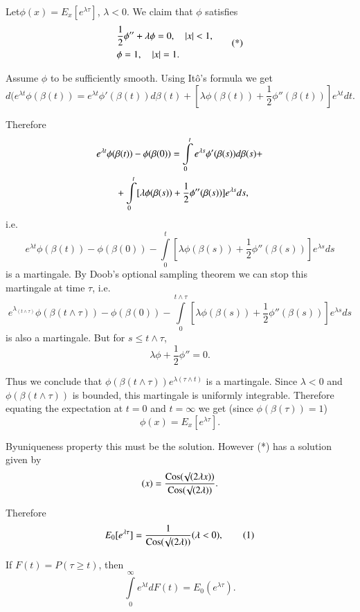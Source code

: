 Let\pageoriginale  $\phi(x)=E_{x}[e^{\lambda\tau}]$, $\lambda<0$. We
claim that $\phi$ satisfies
\begin{equation*}
\begin{split}
& \frac{1}{2}\phi''+\lambda\phi=0,\quad |x|<1,\\
& \phi=1,\quad |x|=1.
\end{split}\tag{*}
\end{equation*}
 
Assume $\phi$ to be sufficiently smooth. Using It\^o's formula we get
$$
d(e^{\lambda t}\phi(\beta(t))=e^{\lambda
  t}\phi'(\beta(t))d\beta(t)+[\lambda\phi(\beta(t))+\frac{1}{2}\phi''(\beta(t))]e^{\lambda t}dt.
$$

Therefore
\begin{align*}
& e^{\lambda
  t}\phi(\beta(t))-\phi(\beta(0))=\int\limits^{t}_{0}e^{\lambda
  s}\phi'(\beta(s))d\beta(s)+\\
&\qquad
  +\int\limits^{t}_{0}[\lambda\phi(\beta(s))+\frac{1}{2}\phi''(\beta(s))]e^{\lambda s}ds,
\end{align*}
i.e.
$$
e^{\lambda
  t}\phi(\beta(t))-\phi(\beta(0))-\int\limits^{t}_{0}[\lambda\phi(\beta(s))+\frac{1}{2}\phi''(\beta(s))]e^{\lambda
  s}ds
$$
is a martingale. By Doob's optional sampling theorem we can stop this
martingale at time $\tau$, i.e.
$$
e^{\lambda_{(t\wedge \tau)}}\phi(\beta(t\wedge
\tau))-\phi(\beta(0))-\int\limits^{t\wedge
  \tau}_{0}[\lambda\phi(\beta(s))+\frac{1}{2}\phi''(\beta(s))]e^{\lambda
  s}ds
$$
is also a martingale. But for $s\leq t\wedge \tau$,
$$
\lambda \phi+\frac{1}{2}\phi''=0.
$$

Thus we conclude that $\phi(\beta(t\wedge \tau))e^{\lambda(\tau\wedge
  t)}$ is a martingale. Since $\lambda<0$ and $\phi(\beta(t\wedge
\tau))$ is bounded, this martingale is uniformly integrable. Therefore
equating the expectation at $t=0$ and $t=\infty$ we get (since
$\phi(\beta(\tau))=1$) 
$$
\phi(x)=E_{x}[e^{\lambda \tau}].
$$

By\pageoriginale uniqueness property this must be the
solution. However (*) has a solution given by
$$
(x)=\frac{\operatorname{Cos} (\surd(2\lambda x))}{\operatorname{Cos} (\surd(2\lambda))}.
$$

Therefore
\begin{equation*}
E_{0}[e^{\lambda \tau}]=\frac{1}{\operatorname{Cos}(\surd(2\lambda))}(\lambda<0),\tag{1}
\end{equation*}

If $F(t)=P(\tau\geq t)$, then
$$
\int\limits^{\infty}_{0}e^{\lambda t}dF(t)=E_{0}(e^{\lambda \tau}).
$$

